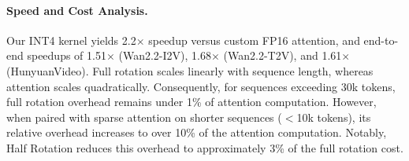 \paragraph{\textbf{Speed and Cost Analysis.}} Our INT4 kernel yields 2.2$\times$ speedup versus custom FP16 attention, and end-to-end speedups of 1.51$\times$ (Wan2.2-I2V), 1.68$\times$ (Wan2.2-T2V), and 1.61$\times$ (HunyuanVideo). Full rotation scales linearly with sequence length, whereas attention scales quadratically. Consequently, for sequences exceeding 30k tokens, full rotation overhead remains under 1\% of attention computation. However, when paired with sparse attention on shorter sequences ($<$10k tokens), its relative overhead increases to over 10\% of the attention computation. Notably, Half Rotation reduces this overhead to approximately 3\% of the full rotation cost.


